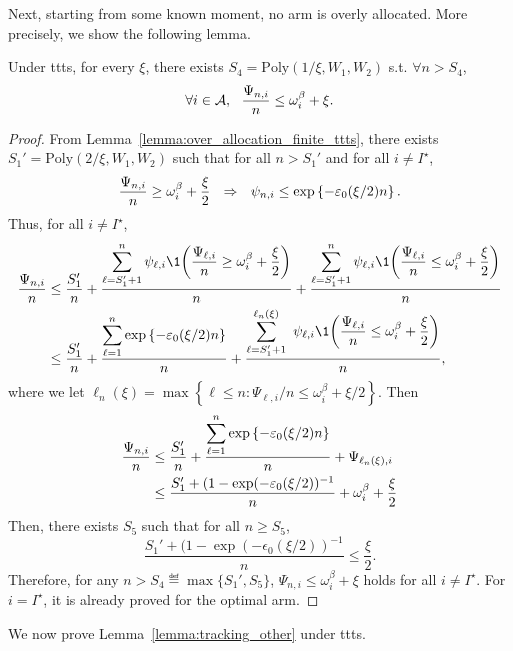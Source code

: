 Next, starting from some known moment, no arm is overly allocated. More precisely, we show the following lemma.

\begin{lemma}\label{lemma:psi_other_ttts}
    Under \gls{ttts}, for every $\xi$, there exists $S_4 = \text{Poly}(1/\xi,W_1,W_2)$ s.t. $\forall n > S_4$,
    \[
        \forall i \in \mathcal{A}, \ \ \frac{\Psi_{n,i}}{n} \leq \omega_{i}^\beta + \xi.
    \]
\end{lemma}

\begin{proof}
    From Lemma~\ref{lemma:over_allocation_finite_ttts}, there exists $S_1' = \text{Poly}(2/\xi,W_1,W_2)$ such that for all $n > S_1'$ and for all $i\neq I^\star$, 
    \[
        \frac{\Psi_{n,i}}{n} \geq \omega_{i}^\beta + \frac{\xi}{2}  \ \ \Rightarrow \ \ \psi_{n,i} \leq \exp\left\{-\varepsilon_0(\xi/2) n\right\}.
    \] 
    Thus, for all $i \neq I^\star$,
    \begin{align*}
        \frac{\Psi_{n,i}}{n} 
        &\leq \frac{S_1'}{n} + \ddfrac{\sum_{\ell=S_1'+1}^n \psi_{\ell,i}\1{\left(\frac{\Psi_{\ell,i}}{n} \geq \omega_{i}^\beta+\frac{\xi}{2}\right)}}{n} + \ddfrac{\sum_{\ell=S_1'+1}^n \psi_{\ell,i}\1{\left(\frac{\Psi_{\ell,i}}{n} \leq \omega_{i}^\beta + \frac{\xi}{2}\right)}}{n} \\
        &\leq \frac{S_1'}{n} + \ddfrac{\sum_{\ell=1}^n \expp{-\epsilon_0(\xi/2) n}}{n} + \ddfrac{\sum_{\ell=S_1'+1}^{\ell_n(\xi)}\ \psi_{\ell,i}\1{\left(\frac{\Psi_{\ell,i}}{n} \leq \omega_{i}^\beta + \frac{\xi}{2}\right)}}{n},
    \end{align*}
    where we let $\ell_n(\xi) = \max\left\{ \ell \leq n : \Psi_{\ell,i}/n \leq \omega_{i}^\beta + \xi/2\right\}$. Then
    \begin{align*}
        \frac{\Psi_{n,i}}{n} 
        &\leq \frac{S_1'}{n} + \frac{\displaystyle \sum_{\ell=1}^n \exp\left\{-\varepsilon_0(\xi/2) n\right\}}{\displaystyle n} + \Psi_{\ell_n(\xi),i}\\
        &\leq \frac{S_1' + (1 - \exp(-\varepsilon_0(\xi/2))^{-1}}{n}+ \omega_{i}^\beta + \frac{\xi}{2}
    \end{align*}
    Then, there exists $S_5$ such that for all $n \geq S_5$,
    \[
        \frac{S_1' + (1 - \exp(-\epsilon_0(\xi/2))^{-1}}{n} \leq \frac{\xi}{2}.
    \]
    Therefore, for any $n > S_4 \eqdef \max\{S_1',S_5\}$, $\Psi_{n,i} \leq \omega_i^\beta + \xi$ holds for all $i\neq I^\star$. For $i = I^\star$, it is already proved for the optimal arm.
\end{proof}

We now prove Lemma~\ref{lemma:tracking_other} under \gls{ttts}.

